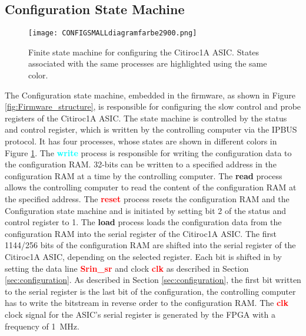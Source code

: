 \subsection{Configuration State Machine}
\begin{figure}[H]
    \centering
    \texttt{[image: CONFIGSMALLdiagramfarbe2900.png]}%
    \caption{Finite state machine for configuring the Citiroc1A ASIC.
    States associated with the same processes are highlighted using the same color.}
    \label{fig:Configuration_state_machine}
\end{figure}
The Configuration state machine, embedded 
in the firmware, as shown in Figure \ref{fig:Firmware_structure}, is responsible for configuring the slow control and probe registers of the Citiroc1A ASIC.
The state machine is controlled by the status and control register, which is written by the controlling computer via the IPBUS protocol.
It has four processes, whose states are shown in different colors in Figure \ref{fig:Configuration_state_machine}.
\newline
The \textbf{\textcolor{cyan}{write}} process is responsible for writing the configuration data to the configuration RAM.
32-bits can be written to a specified address in the configuration RAM at a time by the controlling computer.
\newline
The \textbf{\textcolor{yellow!60!black}{read}} process allows the controlling computer to read the content of the configuration RAM at the specified address.
\newline
The \textbf{\textcolor{red}{reset}} process resets the configuration RAM and the Configuration state machine and is initiated by setting bit 2 of the status and control register to 1.
\newline
The \textbf{\textcolor{VioletRed}{load}} process loads the configuration data from the configuration RAM into the serial register of the Citiroc1A ASIC. 
The first 1144/256 bits of the configuration RAM are shifted into the serial register of the Citiroc1A ASIC, depending on the selected register.
Each bit is shifted in by setting the data line \textbf{\textcolor{red}{Srin\_sr}} and clock \textbf{\textcolor{red}{clk}} as described in Section \ref{sec:configuration}.
As described in Section \ref{sec:configuration}, the first bit written to the serial register is the last bit of the configuration, the controlling computer has to write the bitstream in reverse order to the configuration RAM.
\newline
The \textbf{\textcolor{red}{clk}} clock signal for the ASIC's serial register is generated by the FPGA with a frequency of \SI{1}{\mega\hertz}.
